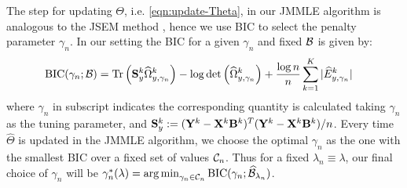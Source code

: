 The step for updating $\Theta$, i.e. \eqref{eqn:update-Theta}, in our JMMLE algorithm is analogous to the JSEM method \citet{MaMichailidis15}, hence we use BIC to select the penalty parameter $\gamma_n$. In our setting the BIC for a given $\gamma_n$ and fixed ${\cal{B}}$ is given by:
%
\begin{align*}
\text{BIC} (\gamma_n; {\cal{B}}) &=
\operatorname*{Tr} \left( {\mathbf{S}}_y^k \widehat \Omega_{y,\gamma_n}^k \right) - \log \det \left( \widehat \Omega_{y,\gamma_n}^k \right) +
\frac{\log n}{n} \sum_{k=1}^K | \widehat E_{y,\gamma_n}^k |
\end{align*}
%
where $\gamma_n$ in subscript indicates the corresponding quantity is calculated taking $\gamma_n$ as the tuning parameter, and ${\mathbf{S}}_y^k := ({\mathbf{Y}}^k - {\mathbf{X}}^k {\mathbf{B}}^k)^T ({\mathbf{Y}}^k - {\mathbf{X}}^k {\mathbf{B}}^k)/n$. Every time $\widehat \Theta$ is updated in the JMMLE algorithm, we choose the optimal $\gamma_n$ as the one with the smallest BIC over a fixed set of values ${\cal{C}}_n$. Thus for a fixed $\lambda_n \equiv \lambda$, our final choice of $\gamma_n$ will be 
$
\gamma_n^* (\lambda) = \operatorname*{arg\,min}_{\gamma_n \in {\cal{C}}_n} \text{BIC} (\gamma_n; \widehat {{\cal{B}}}_{\lambda_n})
$.


%
%
%

%

